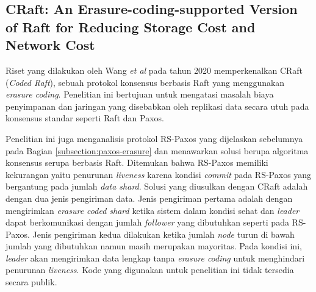 \subsection{CRaft: An Erasure-coding-supported Version of Raft for Reducing Storage Cost and Network Cost}
\label{subsection:craft}

Riset yang dilakukan oleh Wang \textit{et al} pada tahun 2020 memperkenalkan CRaft (\textit{Coded Raft}), sebuah protokol konsensus berbasis Raft yang menggunakan \textit{erasure coding}. Penelitian ini bertujuan untuk mengatasi masalah biaya penyimpanan dan jaringan yang disebabkan oleh replikasi data secara utuh pada konsensus standar seperti Raft dan Paxos.

Penelitian ini juga menganalisis protokol RS-Paxos yang dijelaskan sebelumnya pada Bagian \ref{subsection:paxos-erasure} dan menawarkan solusi berupa algoritma konsensus serupa berbasis Raft. Ditemukan bahwa RS-Paxos memiliki kekurangan yaitu penurunan \textit{liveness} karena kondisi \textit{commit} pada RS-Paxos yang bergantung pada jumlah \textit{data shard}. Solusi yang diusulkan dengan CRaft adalah dengan dua jenis pengiriman data. Jenis pengiriman pertama adalah dengan mengirimkan \textit{erasure coded shard} ketika sistem dalam kondisi sehat dan \textit{leader} dapat berkomunikasi dengan jumlah \textit{follower} yang dibutuhkan seperti pada RS-Paxos. Jenis pengiriman kedua dilakukan ketika jumlah \textit{node} turun di bawah jumlah yang dibutuhkan namun masih merupakan mayoritas. Pada kondisi ini, \textit{leader} akan mengirimkan data lengkap tanpa \textit{erasure coding} untuk menghindari penurunan \textit{liveness}. Kode yang digunakan untuk penelitian ini tidak tersedia secara publik.
